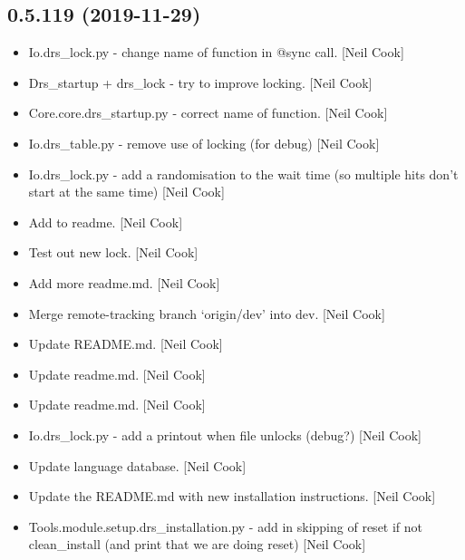 \documentclass[a4paper,10pt,english]{report}
\begin{document}
\subsection{0.5.119 (2019-11-29)}
\label{\detokenize{misc/changelog:id22}}\begin{itemize}
\item {} 
Io.drs\_lock.py - change name of function in @sync call. {[}Neil Cook{]}

\item {} 
Drs\_startup + drs\_lock - try to improve locking. {[}Neil Cook{]}

\item {} 
Core.core.drs\_startup.py - correct name of function. {[}Neil Cook{]}

\item {} 
Io.drs\_table.py - remove use of locking (for debug) {[}Neil Cook{]}

\item {} 
Io.drs\_lock.py - add a randomisation to the wait time (so multiple
hits don’t start at the same time) {[}Neil Cook{]}

\item {} 
Add to readme. {[}Neil Cook{]}

\item {} 
Test out new lock. {[}Neil Cook{]}

\item {} 
Add more readme.md. {[}Neil Cook{]}

\item {} 
Merge remote-tracking branch ‘origin/dev’ into dev. {[}Neil Cook{]}

\item {} 
Update README.md. {[}Neil Cook{]}

\item {} 
Update readme.md. {[}Neil Cook{]}

\item {} 
Update readme.md. {[}Neil Cook{]}

\item {} 
Io.drs\_lock.py - add a printout when file unlocks (debug?) {[}Neil Cook{]}

\item {} 
Update language database. {[}Neil Cook{]}

\item {} 
Update the README.md with new installation instructions. {[}Neil Cook{]}

\item {} 
Tools.module.setup.drs\_installation.py - add in skipping of reset if
not clean\_install (and print that we are doing reset) {[}Neil Cook{]}


\end{itemize}
\end{document}
